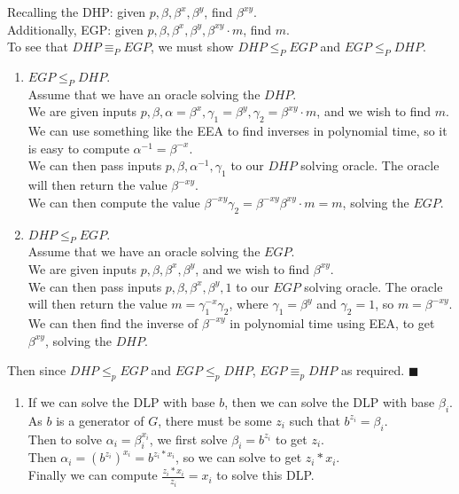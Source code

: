 \documentclass{assignment}
\begin{document}
\begin{problemlist}
\pbitem
\begin{problem}
  Recalling the DHP: given $p,\beta, \beta^x, \beta^y$, find $\beta^{xy}$.\\
  Additionally, EGP: given $p, \beta, \beta^x, \beta^y, \beta^{xy}\cdot m$, find $m$.\\
  To see that $DHP \equiv_P EGP$, we must show $DHP \le_P EGP$ and $EGP \le_P DHP$.\\
  \begin{enumerate}
  \item $EGP \le_P DHP$.\\
    Assume that we have an oracle solving the $DHP$.\\
    We are given inputs $p, \beta, \alpha=\beta^x, \gamma_1=\beta^y, \gamma_2=\beta^{xy}\cdot m$, and we wish to find $m$.\\
    We can use something like the EEA to find inverses in polynomial time, so it is easy to compute $\alpha^{-1}=\beta^{-x}$.\\
    We can then pass inputs $p, \beta, \alpha^{-1}, \gamma_1$ to our $DHP$ solving oracle. The oracle will then return the value $\beta^{-xy}$.\\
    We can then compute the value $\beta^{-xy}\gamma_2=\beta^{-xy}\beta^{xy}\cdot m=m$, solving the $EGP$.
  \item $DHP \le_P EGP$.\\
    Assume that we have an oracle solving the $EGP$.\\
    We are given inputs $p, \beta, \beta^x, \beta^y$, and we wish to find $\beta^{xy}$.\\
    We can then pass inputs $p, \beta, \beta^x, \beta^y, 1$ to our $EGP$ solving oracle. The oracle will then return the value $m=\gamma_1^{-x}\gamma_2$, where $\gamma_1=\beta^y$ and $\gamma_2=1$, so $m=\beta^{-xy}$.\\
    We can then find the inverse of $\beta^{-xy}$ in polynomial time using EEA, to get $\beta^{xy}$, solving the $DHP$.
  \end{enumerate}
  Then since $DHP \le_p EGP$ and $EGP \le_p DHP$, $EGP \equiv_p DHP$ as required. $\blacksquare$
\end{problem}

\pbitem
\begin{problem}
  \begin{enumerate}
  \item
    If we can solve the DLP with base $b$, then we can solve the DLP with base $\beta_i$.\\
    As $b$ is a generator of $G$, there must be some $z_i$ such that $b^{z_i}=\beta_i$.\\
    Then to solve $\alpha_i=\beta_i^{x_i}$, we first solve $\beta_i=b^{z_i}$ to get $z_i$.\\
    Then $\alpha_i=(b^{z_i})^{x_i}=b^{z_i*x_i}$, so we can solve to get $z_i*x_i$.\\
    Finally we can compute $\frac{z_i*x_i}{z_i}=x_i$ to solve this DLP.\\
    

\end{enumerate}
\end{problem}
\end{problemlist}
\end{document}
